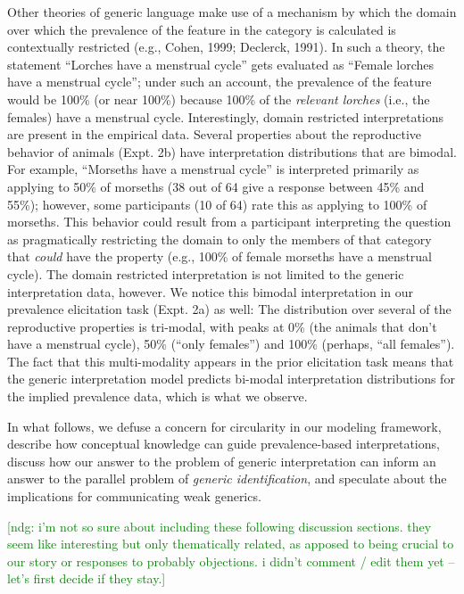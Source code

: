 \documentclass[,man,floatsintext]{apa6}
\theoremstyle{definition}
\theoremstyle{definition}
\theoremstyle{definition}
\theoremstyle{remark}
\begin{document}
Other theories of generic language make use of a mechanism by which the
domain over which the prevalence of the feature in the category is
calculated is contextually restricted (e.g., Cohen, 1999; Declerck,
1991). In such a theory, the statement \enquote{Lorches have a menstrual
cycle} gets evaluated as \enquote{Female lorches have a menstrual
cycle}; under such an account, the prevalence of the feature would be
100\% (or near 100\%) because 100\% of the \emph{relevant lorches}
(i.e., the females) have a menstrual cycle. Interestingly, domain
restricted interpretations are present in the empirical data. Several
properties about the reproductive behavior of animals (Expt. 2b) have
interpretation distributions that are bimodal. For example,
\enquote{Morseths have a menstrual cycle} is interpreted primarily as
applying to 50\% of morseths (38 out of 64 give a response between 45\%
and 55\%); however, some participants (10 of 64) rate this as applying
to 100\% of morseths. This behavior could result from a participant
interpreting the question as pragmatically restricting the domain to
only the members of that category that \emph{could} have the property
(e.g., 100\% of female morseths have a menstrual cycle). The domain
restricted interpretation is not limited to the generic interpretation
data, however. We notice this bimodal interpretation in our prevalence
elicitation task (Expt. 2a) as well: The distribution over several of
the reproductive properties is tri-modal, with peaks at 0\% (the animals
that don't have a menstrual cycle), 50\% (\enquote{only females}) and
100\% (perhaps, \enquote{all females}). The fact that this
multi-modality appears in the prior elicitation task means that the
generic interpretation model predicts bi-modal interpretation
distributions for the implied prevalence data, which is what we observe.

In what follows, we defuse a concern for circularity in our modeling
framework, describe how conceptual knowledge can guide prevalence-based
interpretations, discuss how our answer to the problem of generic
interpretation can inform an answer to the parallel problem of
\emph{generic identification}, and speculate about the implications for
communicating weak generics.

{\textcolor{Green}{[ndg: i'm not so sure about including these following discussion sections. they seem like interesting but only thematically related, as apposed to being crucial to our story or responses to probably objections. i didn't comment / edit them yet -- let's first decide if they stay.]}}
\end{document}
